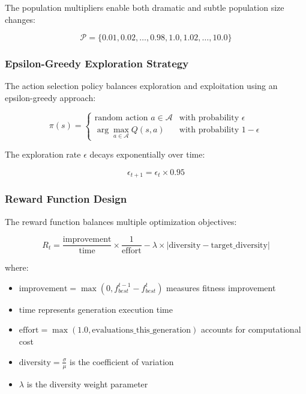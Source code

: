 \documentclass[12pt,a4paper]{article}
\begin{document}
The population multipliers enable both dramatic and subtle population size changes:

\begin{equation}\label{Eq.pop_multipliers}
\mathcal{P} = \{0.01, 0.02, \ldots, 0.98, 1.0, 1.02, \ldots, 10.0\}
\end{equation}

\subsubsection{Epsilon-Greedy Exploration Strategy}

The action selection policy balances exploration and exploitation using an epsilon-greedy approach:

\begin{equation}\label{Eq.epsilon_greedy}
\pi(s) = \begin{cases}
\text{random action } a \in \mathcal{A} & \text{with probability } \epsilon \\
\arg\max_{a \in \mathcal{A}} Q(s, a) & \text{with probability } 1-\epsilon
\end{cases}
\end{equation}

The exploration rate $\epsilon$ decays exponentially over time:

\begin{equation}\label{Eq.epsilon_decay}
\epsilon_{t+1} = \epsilon_t \times 0.95
\end{equation}

\subsubsection{Reward Function Design}

The reward function balances multiple optimization objectives:

\begin{equation}\label{Eq.rl_reward}
R_t = \frac{\text{improvement}}{\text{time}} \times \frac{1}{\text{effort}} - \lambda \times |\text{diversity} - \text{target\_diversity}|
\end{equation}

where:
\begin{itemize}
\item $\text{improvement} = \max(0, f_{best}^{t-1} - f_{best}^t)$ measures fitness improvement
\item $\text{time}$ represents generation execution time
\item $\text{effort} = \max(1.0, \text{evaluations\_this\_generation})$ accounts for computational cost
\item $\text{diversity} = \frac{\sigma}{\mu}$ is the coefficient of variation
\item $\lambda$ is the diversity weight parameter
\end{itemize}
\end{document}
